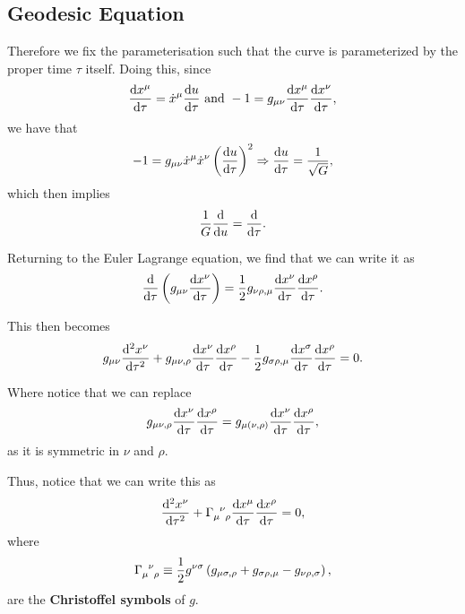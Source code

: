 
\subsection{Geodesic Equation}

Therefore we fix the parameterisation such that the curve is parameterized by the proper time $\tau$ itself. Doing this, since
\begin{align}
    \dv{x^{\mu}}{\tau} = \dot{x}^{\mu} \dv{u}{\tau} \text{~and~} -1 = g_{\mu \nu} \dv{x^{\mu}}{\tau} \dv{x^{\nu}}{\tau}
,\end{align}
we have that
\begin{align}
    -1 = g_{\mu \nu} \dot{x}^{\mu} \dot{x}^{\nu} \left( \dv{u}{\tau} \right)^2 \Rightarrow \dv{u}{\tau} =  \frac{1}{\sqrt{G}}
,\end{align}
which then implies
\begin{align}
    \frac{1}{G} \dv{u} = \dv{\tau}
.\end{align}

Returning to the Euler Lagrange equation, we find that we can write it as
\begin{align}
    \dv{\tau} \left( g_{\mu \nu} \dv{x^{\nu}}{\tau} \right)  = \frac{1}{2} g_{\nu \rho , \mu} \dv{x^{\nu}}{\tau} \dv{x^{\rho}}{\tau}
.\end{align}


This then becomes
\begin{align}
    g_{\mu \nu} \dv[2]{x^{\nu}}{\tau} + g_{\mu \nu , \rho} \dv{x^{\nu}}{\tau} \dv{x^{\rho}}{\tau} - \frac{1}{2} g_{\sigma \rho, \mu} \dv{x^{\sigma}}{\tau} \dv{x^{\rho}}{\tau} = 0
.\end{align}

Where notice that we can replace
\begin{align}
    g_{\mu \nu, \rho} \dv{x^{\nu}}{\tau} \dv{x^{\rho}}{\tau} = g_{\mu ( \nu , \rho )} \dv{x^{\nu}}{\tau} \dv{x^{\rho}}{\tau}
,\end{align}
as it is symmetric in $\nu$ and $\rho$.

Thus, notice that we can write this as
\begin{align} \label{eq:geodesic}
    \dv[2]{x^{\nu}}{\tau} + \tensor{\Gamma}{_{\mu}^{\nu}_\rho} \dv{x^{\mu}}{\tau} \dv{x^{\rho}}{\tau} = 0
,\end{align}
where 
\begin{align}
    \tensor{\Gamma}{_{\mu}^{\nu}_\rho} \equiv \frac{1}{2} g^{\nu \sigma} \left( g_{\mu \sigma , \rho} + g_{\sigma \rho , \mu} - g_{\nu \rho , \sigma} \right) 
,\end{align}
are the \textbf{Christoffel symbols} of $g$.

